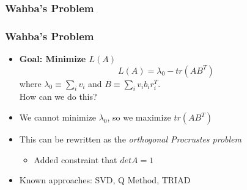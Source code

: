 \documentclass[11pt]{beamer}
\begin{document}
    \begin{frame}
        \frametitle{Wahba's Problem}
         \bigskip
    \end{frame}

    \begin{frame}
        \frametitle{Wahba's Problem}
        \begin{itemize}[<+->]
            \item \textbf{Goal: Minimize $L(A)$}
            \begin{equation*}
                L(A) = \lambda_0 - tr(AB^T)
            \end{equation*}
            where $\lambda_0 \equiv \sum_i v_i$ and $B \equiv \sum_i v_i b_i r_i^T$. \medskip
            \\ How can we do this? \medskip
            \item We cannot minimize $\lambda_0$, so we maximize $tr(AB^T)$\medskip
            \item This can be rewritten as the \textit{orthogonal Procrustes problem}  \medskip
            \begin{itemize}
                \item Added constraint that $\mathit{det} A = 1$ \medskip
            \end{itemize}
            \item Known approaches: SVD, Q Method, TRIAD \medskip
        \end{itemize}
    \end{frame}

\end{document}
